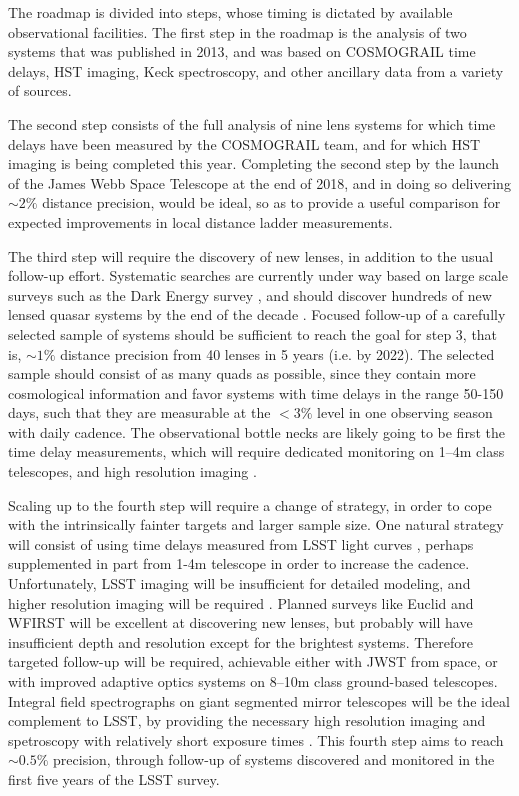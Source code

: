 The roadmap is divided into steps, whose timing is dictated by
available observational facilities.
The first step in the roadmap is the analysis
of two systems that was published in 2013, and was based on COSMOGRAIL time
delays, HST imaging, Keck spectroscopy, and other ancillary data from
a variety of sources.

The second step consists of the full analysis of
nine lens systems for which time delays have been measured by the
COSMOGRAIL team, and for which HST imaging is being completed this
year. Completing the second step by the launch of the James Webb Space
Telescope at the end of 2018,
and in doing so delivering $\sim2\%$ distance precision,
would be ideal, so as to provide a useful
comparison for expected improvements in local distance ladder
measurements.

The third step will require the discovery of new lenses, in addition
to the usual follow-up effort. Systematic searches are currently under
way based on large scale surveys such as the Dark Energy survey
\citep{Agn++15,Mor++16}, and should
discover hundreds of new lensed quasar systems by the
end of the decade \citep{O+M10}.
Focused follow-up of a carefully selected sample of
systems should be sufficient to reach the goal for step 3, that is,
$\sim1\%$ distance precision from 40
lenses in 5 years (i.e. by 2022). The selected sample should
consist of as many quads as possible, since they contain more
cosmological information and favor systems with time delays in the
range 50-150 days, such that they are measurable at the
$<3\%$ level in one observing
season with daily cadence. The observational bottle necks are likely
going to be first the time delay measurements, which will require
dedicated monitoring on 1--4m class telescopes, and high resolution
imaging \citep{Tre++13}.

Scaling up to the fourth step will require a change of strategy, in
order to cope with the intrinsically fainter targets and larger sample
size. One natural strategy will consist of using time delays measured
from LSST light curves \citep{LiaoEtal2015}, perhaps supplemented in
part from 1-4m telescope in order to increase the
cadence. Unfortunately, LSST imaging will be insufficient for detailed
modeling, and higher resolution imaging will be required
\citep{Men++15}.
Planned surveys like Euclid and WFIRST will be excellent at
discovering new lenses, but probably will have insufficient depth and
resolution except for the brightest systems. Therefore targeted
follow-up will be required, achievable either with JWST from space, or
with improved adaptive optics systems on 8--10m class ground-based
telescopes. Integral field spectrographs on giant segmented mirror
telescopes will be the ideal complement to LSST, by providing the
necessary high resolution imaging and spetroscopy with relatively
short exposure times
\citep[e.g.][]{Ski++15}.
This fourth step
aims to reach $\sim0.5\%$ precision, through follow-up of systems discovered
and monitored in the first five years of the LSST survey.

